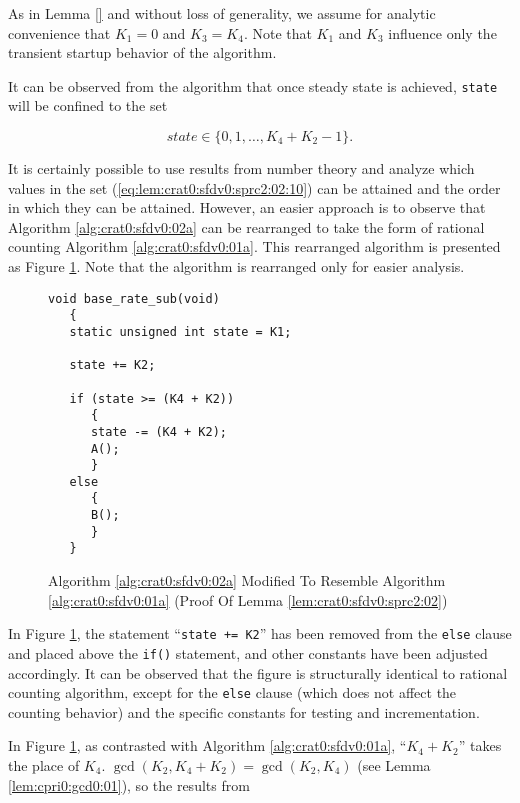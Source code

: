 \begin{vworklemmaproof}
As in Lemma \ref{} and without
loss of generality, we assume for analytic
convenience that $K_1=0$ and $K_3=K_4$.  Note that
$K_1$ and $K_3$ influence only the transient startup
behavior of the algorithm.

It can be observed from the algorithm that once steady
state is achieved, \texttt{state} will be confined to the set

\begin{equation}
\label{eq:lem:crat0:sfdv0:sprc2:02:10}
state \in \{ 0, 1, \ldots , K_4 + K_2 - 1 \} .
\end{equation}

It is certainly possible to use results from
number theory and analyze which values in the 
set (\ref{eq:lem:crat0:sfdv0:sprc2:02:10}) can be 
attained and the order in which they can be attained.
However, an easier approach is to observe that 
Algorithm \ref{alg:crat0:sfdv0:02a} 
can be rearranged to take the form of
rational counting Algorithm \ref{alg:crat0:sfdv0:01a}.  
This rearranged
algorithm is presented as 
Figure \ref{fig:lem:crat0:sfdv0:sprc2:02:01}.  Note that the
algorithm is rearranged only for easier analysis.

\begin{figure}
\begin{verbatim}
void base_rate_sub(void)
   {
   static unsigned int state = K1;

   state += K2;
   
   if (state >= (K4 + K2))
      {
      state -= (K4 + K2);
      A();
      }
   else
      {
      B();
      }
   }
\end{verbatim}
\caption{Algorithm \ref{alg:crat0:sfdv0:02a} Modified To Resemble Algorithm \ref{alg:crat0:sfdv0:01a}
         (Proof Of Lemma \ref{lem:crat0:sfdv0:sprc2:02})}
\label{fig:lem:crat0:sfdv0:sprc2:02:01}
\end{figure}

In Figure \ref{fig:lem:crat0:sfdv0:sprc2:02:01}, the
statement ``\texttt{state += K2}'' has been removed from the
\texttt{else} clause and placed above the \texttt{if()} statement,
and other constants have been adjusted accordingly.
It can be observed that the figure
is structurally identical to rational counting algorithm, except for the 
\texttt{else} clause (which does not affect the counting behavior) and
the specific constants for testing and incrementation.

In Figure \ref{fig:lem:crat0:sfdv0:sprc2:02:01}, as contrasted with
Algorithm \ref{alg:crat0:sfdv0:01a}, ``$K_4 + K_2$'' takes the
place of $K_4$.  $\gcd(K_2, K_4 + K_2) = \gcd(K_2, K_4)$
(see Lemma \cprizeroxrefhyphen\ref{lem:cpri0:gcd0:01}), so the 
results from 
\end{vworklemmaproof}

